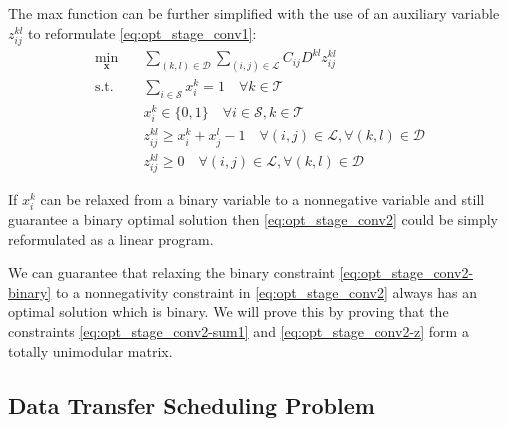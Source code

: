 The max function can be further simplified with the use of an auxiliary variable $z_{ij}^{kl}$ to reformulate \eqref{eq:opt_stage_conv1}:
\begin{subequations}\label{eq:opt_stage_conv2}
	\begin{align}
		\min_{\mathbf{x}} \quad & \sum_{(k,l)\in\mathcal{D}}\sum_{(i,j)\in\mathcal{L}}C_{ij}D^{kl}z_{ij}^{kl} \nonumber \\
		\text{s.t.}\quad & \sum_{i\in\mathcal{S}}x_i^k = 1 \quad \forall k\in\mathcal{T} \label{eq:opt_stage_conv2-sum1} \\
		& x_i^k \in \{0,1\} \quad \forall i\in\mathcal{S},k\in\mathcal{T} \label{eq:opt_stage_conv2-binary} \\
		& z_{ij}^{kl} \geq x_i^k+x_j^l-1 \quad \forall (i,j)\in\mathcal{L}, \forall(k,l)\in\mathcal{D} \label{eq:opt_stage_conv2-z}\\
		& z_{ij}^{kl} \geq 0 \quad \forall (i,j)\in\mathcal{L}, \forall(k,l)\in\mathcal{D}
	\end{align}
\end{subequations}

If $x_{i}^k$ can be relaxed from a binary variable to a nonnegative variable and still guarantee a binary optimal solution then \eqref{eq:opt_stage_conv2} could be simply reformulated as a linear program.

\begin{conjecture}
	We can guarantee that relaxing the binary constraint \eqref{eq:opt_stage_conv2-binary} to a nonnegativity constraint in \eqref{eq:opt_stage_conv2} always has an optimal solution which is binary.
	We will prove this by proving that the constraints \eqref{eq:opt_stage_conv2-sum1} and  \eqref{eq:opt_stage_conv2-z} form a totally unimodular matrix.
\end{conjecture}


\subsection{Data Transfer Scheduling Problem}


